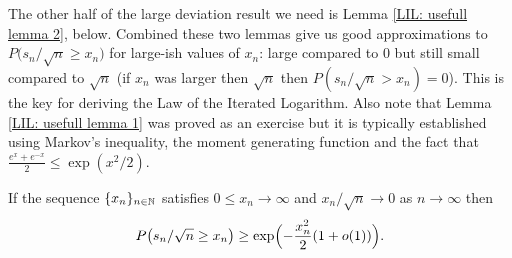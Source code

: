 The other half of the large deviation result we need is Lemma \ref{LIL: usefull lemma 2}, below. Combined these two lemmas give us  good approximations to   $P\bigl(s_n/\sqrt{n} \geq x_n\bigr)$ for large-ish values of $x_n$: large compared to $0$ but still small compared to $\sqrt{n}$ (if $x_n$ was larger then $\sqrt{n}$ then $P(s_n/\sqrt{n} > x_n)=0$). This is the key for deriving the Law of the Iterated Logarithm.
Also note that Lemma \ref{LIL: usefull lemma 1} was proved as an exercise but it is typically established using Markov's inequality, the moment generating function and the fact that $\frac{e^x + e^{-x}}{2} \leq \exp\left({x^2/2}\right)$.


\begin{lemma}
\label{LIL: usefull lemma 2}
If the sequence $\{x_n\}_{n\in\Bbb N}$ satisfies $0\leq x_n \rightarrow \infty$ and $x_n/\sqrt{n}\rightarrow 0$ as $n\rightarrow \infty$ then
 \[ P\bigl(s_n/\sqrt{n} \geq x_n\bigr)\geq \exp\Bigl( -\frac{x_n^2}{2} (1+o(1))\Bigr).\]
\end{lemma}
